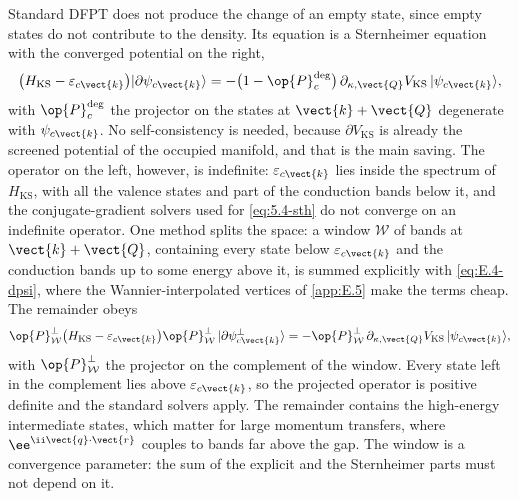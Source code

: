 Standard DFPT does not produce the change of an empty state, since empty states do not contribute to the density. Its equation is a Sternheimer equation with the converged potential on the right,
\begin{equation}
  \bigl(H_{\mathrm{KS}} - \varepsilon_{c\vect{k}}\bigr)|\partial\psi_{c\vect{k}}\rangle = -\bigl(1 - \op{P}^{\mathrm{deg}}_{c}\bigr)\,\partial_{\kappa,\vect{Q}}V_{\mathrm{KS}}\,|\psi_{c\vect{k}}\rangle ,
  \label{eq:E.4-dpsic}
\end{equation}
with $\op{P}^{\mathrm{deg}}_{c}$ the projector on the states at $\vect{k}+\vect{Q}$ degenerate with $\psi_{c\vect{k}}$. No self-consistency is needed, because $\partial V_{\mathrm{KS}}$ is already the screened potential of the occupied manifold, and that is the main saving. The operator on the left, however, is indefinite: $\varepsilon_{c\vect{k}}$ lies inside the spectrum of $H_{\mathrm{KS}}$, with all the valence states and part of the conduction bands below it, and the conjugate-gradient solvers used for \cref{eq:5.4-sth} do not converge on an indefinite operator. One method splits the space: a window $\mathcal{W}$ of bands at $\vect{k}+\vect{Q}$, containing every state below $\varepsilon_{c\vect{k}}$ and the conduction bands up to some energy above it, is summed explicitly with \cref{eq:E.4-dpsi}, where the Wannier-interpolated vertices of \cref{app:E.5} make the terms cheap. The remainder obeys
\begin{equation}
  \op{P}^{\perp}_{\mathcal{W}}\bigl(H_{\mathrm{KS}} - \varepsilon_{c\vect{k}}\bigr)\op{P}^{\perp}_{\mathcal{W}}\,|\partial\psi^{\perp}_{c\vect{k}}\rangle = -\op{P}^{\perp}_{\mathcal{W}}\,\partial_{\kappa,\vect{Q}}V_{\mathrm{KS}}\,|\psi_{c\vect{k}}\rangle ,
  \label{eq:E.4-dpsiperp}
\end{equation}
with $\op{P}^{\perp}_{\mathcal{W}}$ the projector on the complement of the window. Every state left in the complement lies above $\varepsilon_{c\vect{k}}$, so the projected operator is positive definite and the standard solvers apply. The remainder contains the high-energy intermediate states, which matter for large momentum transfers, where $\ee^{\ii\vect{q}\cdot\vect{r}}$ couples to bands far above the gap. The window is a convergence parameter: the sum of the explicit and the Sternheimer parts must not depend on it.

